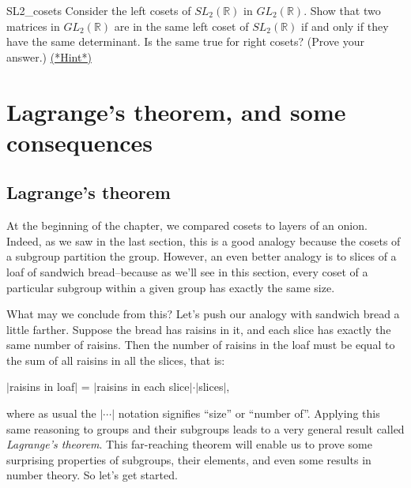 \begin{exercise}{SL2_cosets}
Consider the left cosets of $SL_2( {\mathbb R} )$ in $GL_2( {\mathbb R})$.  Show that two matrices in $GL_2( {\mathbb R})$ are in the same left coset of $SL_2( {\mathbb R} )$ if and only if they have the same determinant. Is the same true for right cosets? (Prove your answer.) \hyperref[sec:Cosets:Hints]{(*Hint*)}
\end{exercise}


 
\section{Lagrange's theorem, and some consequences}
\label{sec:Cosets:LagrangeTheorem}

\subsection{Lagrange's theorem}
\label{subsec:Cosets:LagrangeTheorem:LagrangeTheorem}
At the beginning of the chapter, we compared cosets to layers of an onion.  Indeed, as we saw in the last section, this is a good analogy because the cosets of a subgroup partition the group.  However, an even better analogy is to slices of a loaf of sandwich bread--because as we'll see in this section, every coset of a particular subgroup within a given group has exactly the same size. 

What may we conclude from this? Let's push our analogy with sandwich bread a little farther. Suppose the bread has raisins in it, and each slice has exactly the same number of raisins. Then the number of raisins in the loaf must be equal to the sum of all raisins in all the slices, that is:


$|$raisins in loaf$|$ = $|$raisins in each slice$| \cdot |$slices$|$,

\noindent
where as usual the $| \cdots |$ notation  signifies ``size'' or ``number of''.
Applying this same reasoning to groups and their subgroups leads to a very general result called \emph{Lagrange's theorem}.  This far-reaching theorem will enable us to prove some surprising  properties of subgroups, their elements, and even some results in number theory.  So let's get started.  

